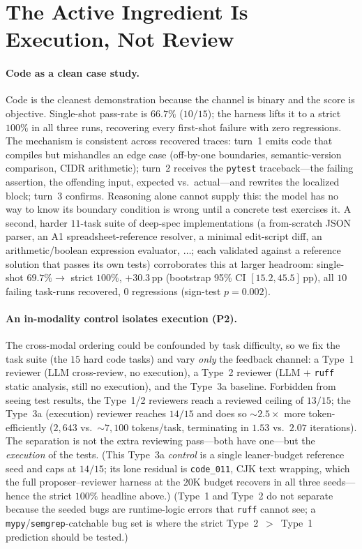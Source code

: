 \section{The Active Ingredient Is Execution, Not Review}
\label{sec:channel}

\paragraph{Code as a clean case study.} Code is the cleanest demonstration because the channel is binary and the score is objective. Single-shot pass-rate is $66.7\%$ ($10/15$); the harness lifts it to a strict $100\%$ in all three runs, recovering every first-shot failure with zero regressions. The mechanism is consistent across recovered traces: turn~1 emits code that compiles but mishandles an edge case (off-by-one boundaries, semantic-version comparison, CIDR arithmetic); turn~2 receives the \texttt{pytest} traceback---the failing assertion, the offending input, expected vs.\ actual---and rewrites the localized block; turn~3 confirms. Reasoning alone cannot supply this: the model has no way to know its boundary condition is wrong until a concrete test exercises it. A second, harder $11$-task suite of deep-spec implementations (a from-scratch JSON parser, an A1 spreadsheet-reference resolver, a minimal edit-script diff, an arithmetic/boolean expression evaluator, $\dots$; each validated against a reference solution that passes its own tests) corroborates this at larger headroom: single-shot $69.7\%\to$ strict $100\%$, $+30.3$\,pp (bootstrap 95\% CI $[15.2,45.5]$\,pp), all $10$ failing task-runs recovered, $0$ regressions (sign-test $p=0.002$).

\paragraph{An in-modality control isolates execution (P2).} The cross-modal ordering could be confounded by task difficulty, so we fix the task suite (the $15$ hard code tasks) and vary \emph{only} the feedback channel: a Type~1 reviewer (LLM cross-review, no execution), a Type~2 reviewer (LLM + \texttt{ruff} static analysis, still no execution), and the Type~3a baseline. Forbidden from seeing test results, the Type~1/2 reviewers reach a reviewed ceiling of $13/15$; the Type~3a (execution) reviewer reaches $14/15$ and does so $\sim$$2.5\times$ more token-efficiently ($2{,}643$ vs.\ ${\sim}7{,}100$ tokens/task, terminating in $1.53$ vs.\ $2.07$ iterations). The separation is not the extra reviewing pass---both have one---but the \emph{execution} of the tests. (This Type~3a \emph{control} is a single leaner-budget reference seed and caps at $14/15$; its lone residual is \texttt{code\_011}, CJK text wrapping, which the full proposer--reviewer harness at the $20$K budget recovers in all three seeds---hence the strict $100\%$ headline above.) (Type~1 and Type~2 do not separate because the seeded bugs are runtime-logic errors that \texttt{ruff} cannot see; a \texttt{mypy}/\texttt{semgrep}-catchable bug set is where the strict Type~2~$>$~Type~1 prediction should be tested.)
